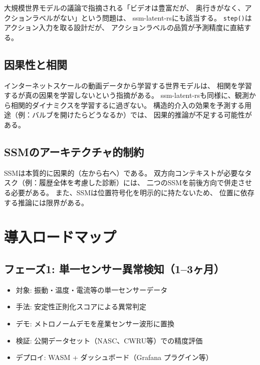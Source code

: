 \documentclass[11pt,a4paper]{ltjsarticle}
\begin{document}
大規模世界モデルの議論で指摘される「ビデオは豊富だが、
奥行きがなく、アクションラベルがない」という問題\cite{notboring2026worldmodels}は、
ssm-latent-rsにも該当する。
\texttt{step()}はアクション入力を取る設計だが、
アクションラベルの品質が予測精度に直結する。

\subsection{因果性と相関}

インターネットスケールの動画データから学習する世界モデルは、
相関を学習するが真の因果を学習しないという指摘がある\cite{graison2026worldmodels}。
ssm-latent-rsも同様に、観測から相関的ダイナミクスを学習するに過ぎない。
構造的介入の効果を予測する用途（例：バルブを開けたらどうなるか）では、
因果的推論が不足する可能性がある。

\subsection{SSMのアーキテクチャ的制約}

SSMは本質的に因果的（左から右へ）である。
双方向コンテキストが必要なタスク（例：履歴全体を考慮した診断）には、
二つのSSMを前後方向で併走させる必要がある。
また、SSMは位置符号化を明示的に持たないため、
位置に依存する推論には限界がある。

\section{導入ロードマップ}

\subsection{フェーズ1: 単一センサー異常検知（1--3ヶ月）}

\begin{itemize}
  \item 対象: 振動・温度・電流等の単一センサーデータ
  \item 手法: 安定性正則化スコアによる異常判定
  \item デモ: メトロノームデモを産業センサー波形に置換
  \item 検証: 公開データセット（NASC、CWRU等）での精度評価
  \item デプロイ: WASM + ダッシュボード（Grafana プラグイン等）
\end{itemize}
\end{document}
